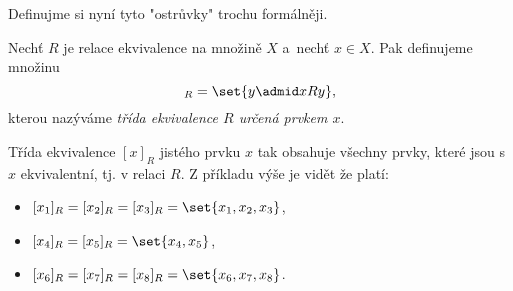 Definujme si nyní tyto "ostrůvky" trochu formálněji.
\begin{definition}
    Nechť $R$ je relace ekvivalence na množině $X$ a~nechť $x\in X$. Pak definujeme množinu
    \begin{equation*}
        [x]_R=\set{y \admid xRy},
    \end{equation*}
    kterou nazýváme \emph{třída ekvivalence $R$ určená prvkem $x$}.
\end{definition}
Třída ekvivalence $[x]_R$ jistého prvku $x$ tak obsahuje všechny prvky, které jsou s $x$ ekvivalentní, tj. v relaci $R$. Z příkladu výše je vidět že platí:
\begin{itemize}
    \item $[x_1]_R=[x_2]_R=[x_3]_R=\set{x_1,x_2,x_3}$,
    \item $[x_4]_R=[x_5]_R=\set{x_4,x_5}$,
    \item $[x_6]_R=[x_7]_R=[x_8]_R=\set{x_6,x_7,x_8}$.
\end{itemize}
